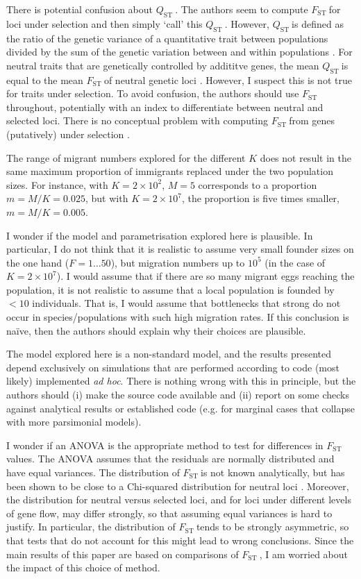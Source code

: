 \documentclass[11pt]{article}
\newenvironment{my_enumerate}
{\begin{enumerate}
  \setlength{\itemsep}{2pt}
  \setlength{\parskip}{0pt}
  \setlength{\parsep}{0pt}}
{\end{enumerate}}
\newcommand{\fst}{$F_{\mathrm{ST}}\ $}
\newcommand{\qst}{$Q_{\mathrm{ST}}\ $}
\begin{document}
\begin{my_enumerate}
	\item There is potential confusion about \qst. The authors seem to compute \fst for loci under selection and then simply `call' this \qst. However, \qst is defined as the ratio of the genetic variance of a quantitative trait between populations divided by the sum of the genetic variation between and within populations \cite[][and references therein]{Whitlock:2008uq}. For neutral traits that are genetically controlled by addititve genes, the mean \qst is equal to the mean \fst of neutral genetic loci \citep{Whitlock:2008uq}. However, I suspect this is not true for traits under selection. To avoid confusion, the authors should use \fst throughout, potentially with an index to differentiate between neutral and selected loci. There is no conceptual problem with computing \fst from genes (putatively) under selection \cite[e.g.][]{Beaumont:1996zr}.
	\item The range of migrant numbers explored for the different $K$ does not result in the same maximum proportion of immigrants replaced under the two population sizes. For instance, with $K = 2\times10^2$, $M= 5$ corresponds to a proportion $m = M/K = 0.025$, but with $K =  2\times10^7$, the proportion is five times smaller, $m = M/K = 0.005$.
	\item I wonder if the model and parametrisation explored here is plausible. In particular, I do not think that it is realistic to assume very small founder sizes on the one hand ($F= 1\ldots50$), but migration numbers up to $10^5$ (in the case of $K = 2\times10^7$). I would assume that if there are so many migrant eggs reaching the population, it is not realistic to assume that a local population is founded by $<10$ individuals. That is, I would assume that bottlenecks that strong do not occur in species/populations with such high migration rates. If this conclusion is na\"ive, then the authors should explain why their choices are plausible.
	\item The model explored here is a non-standard model, and the results presented depend exclusively on simulations that are performed according to code (most likely) implemented \emph{ad hoc}. There is nothing wrong with this in principle, but the authors should (i) make the source code available and (ii) report on some checks against analytical results or established code (e.g. for marginal cases that collapse with more parsimonial models).
	\item I wonder if an ANOVA is the appropriate method to test for differences in \fst values. The ANOVA assumes that the residuals are normally distributed and have equal variances. The distribution of \fst is not known analytically, but has been shown to be close to a Chi-squared distribution for neutral loci \citep{Lewontin:1973bh, Whitlock:2009vn}. Moreover, the distribution for neutral versus selected loci, and for loci under different levels of gene flow, may differ strongly, so that assuming equal variances is hard to justify. In particular, the distribution of \fst tends to be strongly asymmetric, so that tests that do not account for this might lead to wrong conclusions. Since the main results of this paper are based on comparisons of \fst, I am worried about the impact of this choice of method.

\end{my_enumerate}
\end{document}
